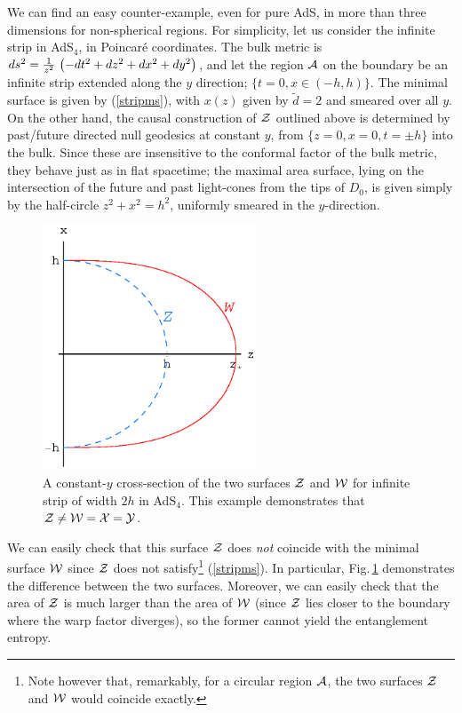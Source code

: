 \documentclass[12pt]{article}
\def\fig#1{Fig.\,\ref{#1}}
\def\req#1{(\ref{#1})}
\def\({\left (}
\def\){\right )}
\def\CA{{\cal A}}
\def\CW{{\cal W}}
\def\CX{{\cal X}}
\def\CY{{\cal Y}}
\def\CZ{{\cal Z}}
\def\Gms{\CW}
\def\Lms{\CY}
\def\Xms{\CX}
\def\Cms{\CZ}
\def\rA{\CA}
\def\ti{\tilde}
\begin{document}
We can find an easy counter-example, even for pure AdS, in more than three dimensions for non-spherical regions.  For simplicity, let us consider the infinite strip in AdS$_4$, in Poincar\'e coordinates.  The bulk metric is
$ds^2 = {1 \over z^2} \, \( -dt^2 + dz^2 + dx^2 + dy^2 \)$, and let the region $\rA$ on the boundary be an infinite strip extended along the $y$ direction; $\{t=0, x \in (-h,h)\}$.  The minimal surface is given by \req{stripms}, with $x(z)$ given by $\ti{d}=2$ and smeared over all $y$.  On the other hand, the causal construction of $\Cms$ outlined above is determined by past/future directed null geodesics at constant $y$, from $\{z=0,x=0,t=\pm h\}$ into the bulk.  Since these are insensitive to the conformal factor of the bulk metric, they behave just as in flat spacetime; the maximal area surface, lying on the intersection of the future and past light-cones from the tips of $D_0$, is given simply by the half-circle $z^2+x^2=h^2$, uniformly smeared in the $y$-direction.
\begin{figure}[htbp]
\begin{center}
\includegraphics[width=2.5in]{ZneW4d}
\caption{A constant-$y$ cross-section of the two surfaces $\Cms$
and $\Gms$ for infinite strip of width $2h$ in AdS$_4$.  This example
demonstrates that $\Cms \ne \Gms  = \Xms = \Lms$.}
\label{ZneW4d}
\end{center}
\end{figure}
%
We can easily check that this surface $\Cms$ does {\it not} coincide with the minimal surface $\Gms$ since $\Cms$ does not satisfy\footnote{
Note however that, remarkably, for a circular region $\rA$, the two surfaces $\Cms$ and $\Gms$ would coincide exactly.
}  \req{stripms}.  In particular, \fig{ZneW4d} demonstrates the difference between the two surfaces.  Moreover, we can easily check that the area of $\Cms$ is much larger than the area of $\Gms$ (since $\Cms$ lies closer to the boundary where the warp factor diverges), so the former cannot yield the entanglement entropy.
\end{document}

